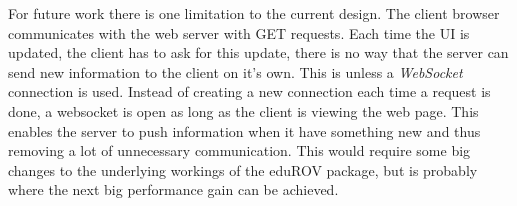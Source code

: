 For future work there is one limitation to the current design. The client browser communicates with the web server with GET requests. Each time the UI is updated, the client has to ask for this update, there is no way that the server can send new information to the client on it's own. This is unless a \emph{WebSocket} connection is used. Instead of creating a new connection each time a request is done, a websocket is open as long as the client is viewing the web page. This enables the server to push information when it have something new and thus removing a lot of unnecessary communication. This would require some big changes to the underlying workings of the eduROV package, but is probably where the next big performance gain can be achieved.